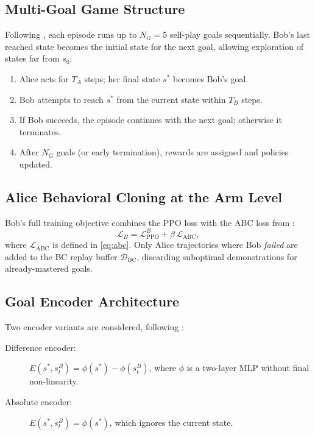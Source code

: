 \documentclass[12pt, a4paper]{article}
\newcommand{\sstar}{s^{*}}
\newcommand{\Enc}{E}
\newcommand{\calL}{\mathcal{L}}
\newcommand{\calD}{\mathcal{D}}
\begin{document}
\subsection{Multi-Goal Game Structure}
\label{subsec:multi_goal}

Following \citet{plappert2021asymmetric}, each episode runs up to $N_G = 5$ self-play goals
sequentially. Bob's last reached state becomes the initial state for the next goal, allowing
exploration of states far from $s_0$:

\begin{enumerate}[label=\arabic*.]
    \item Alice acts for $T_A$ steps; her final state $\sstar$ becomes Bob's goal.
    \item Bob attempts to reach $\sstar$ from the current state within $T_B$ steps.
    \item If Bob succeeds, the episode continues with the next goal; otherwise it terminates.
    \item After $N_G$ goals (or early termination), rewards are assigned and policies updated.
\end{enumerate}

\subsection{Alice Behavioral Cloning at the Arm Level}
\label{subsec:abc_arm}

Bob's full training objective combines the PPO loss with the ABC loss from
\citet{plappert2021asymmetric}:
\begin{equation}
    \calL_B = \calL_{\mathrm{PPO}}^B + \beta\, \calL_{\mathrm{ABC}}, \label{eq:bob_loss}
\end{equation}
where $\calL_{\mathrm{ABC}}$ is defined in \cref{eq:abc}.
Only Alice trajectories where Bob \emph{failed} are added to the BC replay buffer
$\calD_{\mathrm{BC}}$, discarding suboptimal demonstrations for already-mastered goals.

\subsection{Goal Encoder Architecture}
\label{subsec:encoder}

Two encoder variants are considered, following \citet{sukhbaatar2018learning}:

\begin{description}
    \item[Difference encoder:]
          $\Enc(\sstar, s_t^B) = \phi(\sstar) - \phi(s_t^B)$,
          where $\phi$ is a two-layer MLP without final non-linearity.
    \item[Absolute encoder:]
          $\Enc(\sstar, s_t^B) = \phi(\sstar)$,
          which ignores the current state.
\end{description}
\end{document}
